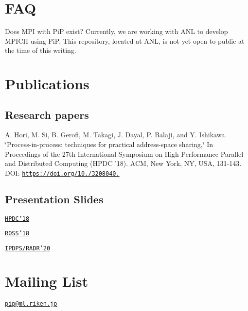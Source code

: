 \documentclass[twoside]{book}
\begin{document}
\section*{F\-A\-Q}


\begin{DoxyItemize}
\item Does M\-P\-I with Pi\-P exist? Currently, we are working with A\-N\-L to develop M\-P\-I\-C\-H using Pi\-P. This repository, located at A\-N\-L, is not yet open to public at the time of this writing.
\end{DoxyItemize}

\section*{Publications}

\subsection*{Research papers}

A. Hori, M. Si, B. Gerofi, M. Takagi, J. Dayal, P. Balaji, and Y. Ishikawa. \char`\"{}\-Process-\/in-\/process\-: techniques for practical address-\/space sharing,\char`\"{} In Proceedings of the 27th International Symposium on High-\/\-Performance Parallel and Distributed Computing (H\-P\-D\-C '18). A\-C\-M, New York, N\-Y, U\-S\-A, 131-\/143. D\-O\-I\-: \href{https://doi.org/10.1145/3208040.3208045}{\tt https\-://doi.\-org/10./3208040.}

\subsection*{Presentation Slides}


\begin{DoxyItemize}
\item \href{presentation/HPDC18-PiP.key.pdf}{\tt H\-P\-D\-C'18}
\item \href{presentation/Ross-2018-PiP.key.pdf}{\tt R\-O\-S\-S'18}
\item \href{presentation/IPDPS20-RADRws.key.pdf}{\tt I\-P\-D\-P\-S/\-R\-A\-D\-R'20}
\end{DoxyItemize}

\section*{Mailing List}

\href{mailto:pip@ml.riken.jp}{\tt pip@ml.\-riken.\-jp}
\end{document}
